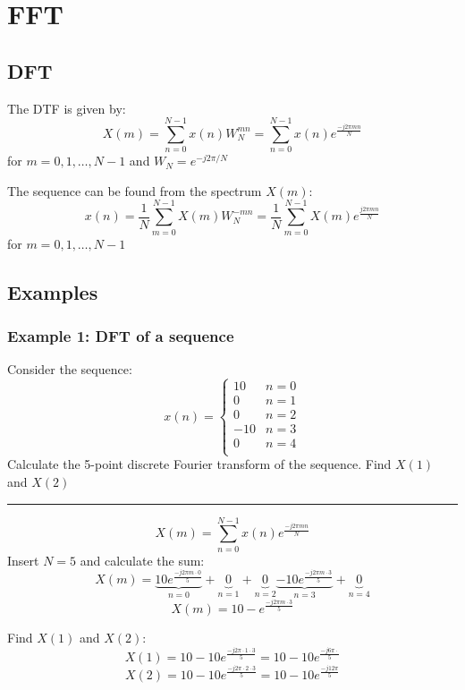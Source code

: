 \section{FFT}
\subsection{DFT}
The DTF is given by:
$$X(m)=\sum_{n=0}^{N-1}x(n)W_{N}^{m n}=\sum_{n=0}^{N-1}x(n)e^{\frac{-j2\pi m n}{N}}$$
for $m=0,1,\dots,N-1$ and $W_N=e^{-j2\pi/N}$

The sequence can be found from the spectrum $X(m)$:
$$x(n)=\frac{1}{N}\sum_{m=0}^{N-1}X(m)W_{N}^{-m n}=\frac{1}{N}\sum_{m=0}^{N-1}X(m)e^{\frac{j2\pi m n}{N}}$$
for $m=0,1,\dots,N-1$

\subsection{Examples}
\subsubsection{Example 1: DFT of a sequence}
Consider the sequence:
$$x(n)=\begin{cases}
  10&n=0\\ 
  0&n=1\\
  0&n=2\\
  -10&n=3\\
  0&n=4\\
\end{cases}$$
Calculate the 5-point discrete Fourier transform of the sequence.
Find $X(1)$ and $X(2)$

\rule{\textwidth}{0.5pt}
$$X(m)=\sum_{n=0}^{N-1}x(n)e^{\frac{-j2\pi m n}{N}}$$
Insert $N=5$ and calculate the sum:
$$X(m)=\underbrace{10e^{\frac{-j2\pi m \cdot 0}{5}}}_{n=0}+\underbrace{0}_{n=1}+\underbrace{0}_{n=2}\underbrace{-10e^{\frac{-j2\pi m \cdot 3}{5}}}_{n=3}+\underbrace{0}_{n=4}$$
$$X(m)=10-e^{\frac{-j2\pi m \cdot 3}{5}}$$

Find $X(1)$ and $X(2)$:
$$X(1)=10-10e^{\frac{-j2\pi\cdot 1 \cdot 3}{5}}=10-10e^{\frac{-j6\pi\cdot}{5}}$$
$$X(2)=10-10e^{\frac{-j2\pi \cdot2 \cdot 3}{5}}=10-10e^{\frac{-j12\pi}{5}}$$

